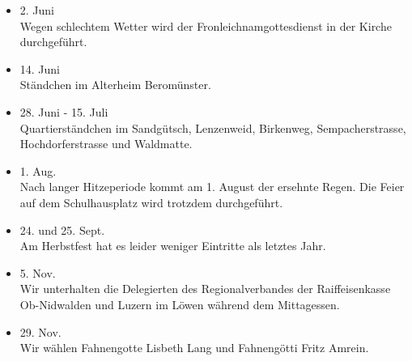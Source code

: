 \begin{history}
\begin{itemize}
        \item[]2. Juni\\
        Wegen schlechtem Wetter wird der Fronleichnamgottesdienst in der Kirche
        durchgeführt.

        \item[]14. Juni\\
        Ständchen im Alterheim Beromünster.

        \item[]28. Juni - 15. Juli\\
        Quartierständchen im Sandgütsch, Lenzenweid, Birkenweg,
        Sempacherstrasse, Hochdorferstrasse und Waldmatte.

        \item[]1. Aug.\\
        Nach langer Hitzeperiode kommt am 1. August der ersehnte Regen. Die
        Feier auf dem Schulhausplatz wird trotzdem durchgeführt.

        \item[]24. und 25. Sept.\\
        Am Herbstfest hat es leider weniger Eintritte als letztes Jahr.

        \item[]5. Nov.\\
        Wir unterhalten die Delegierten des Regionalverbandes der
        Raiffeisenkasse Ob-Nidwalden und Luzern im Löwen während dem
        Mittagessen.

        \item[]29. Nov.\\
        Wir wählen Fahnengotte Lisbeth Lang und Fahnengötti Fritz Amrein.

    \end{itemize}

\end{history}
